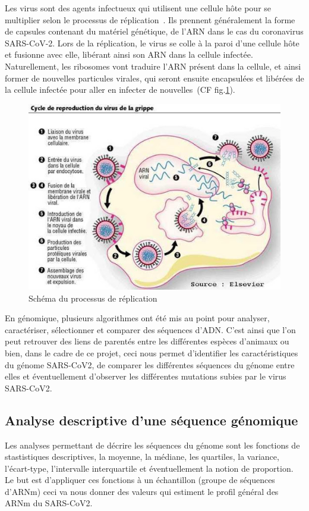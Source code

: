 \documentclass[12pt]{article}
\begin{document}
Les virus sont des agents infectueux qui utilisent une cellule hôte pour se multiplier selon le processus de réplication~\cite{replication}. Ils prennent généralement la forme de capsules contenant du matériel génétique, de l'ARN dans le cas du coronavirus SARS-CoV-2. Lors de la réplication, le virus se colle à la paroi d'une cellule hôte et fusionne avec elle, libérant ainsi son ARN dans la cellule infectée. Naturellement, les ribosomes vont traduire l'ARN présent dans la cellule, et ainsi former de nouvelles particules virales, qui seront ensuite encapsulées et libérées de la cellule infectée pour aller en infecter de nouvelles~\nocite{dnatr}(CF fig.\ref{replication}).\\

\begin{figure}[h!]
    \centering
    \includegraphics[scale = 0.8]{Images/Intro/replication.jpg}
    \caption{Schéma du processus de réplication}
    \label{replication}
\end{figure}

\newpage

En génomique, plusieurs algorithmes ont été mis au point pour analyser, caractériser, sélectionner et comparer des séquences d'ADN. C'est ainsi que l'on peut retrouver des liens de parentés entre les différentes espèces d'animaux ou bien, dans le cadre de ce projet, ceci nous permet d'identifier les caractéristiques du génome SARS-CoV2, de comparer les différentes séquences du génome entre elles et éventuellement d'observer les différentes mutations subies par le virus SARS-CoV2.


\subsection{Analyse descriptive d'une séquence génomique} 
Les analyses permettant de décrire les séquences du génome sont les fonctions de stastistiques descriptives, la moyenne, la médiane, les quartiles, la variance, l'écart-type, l'intervalle interquartile et éventuellement la notion de proportion. Le but est d'appliquer ces fonctions à un échantillon (groupe de séquences d'ARNm) ceci va nous donner des valeurs qui estiment le profil général des ARNm du SARS-CoV2.
\end{document}
